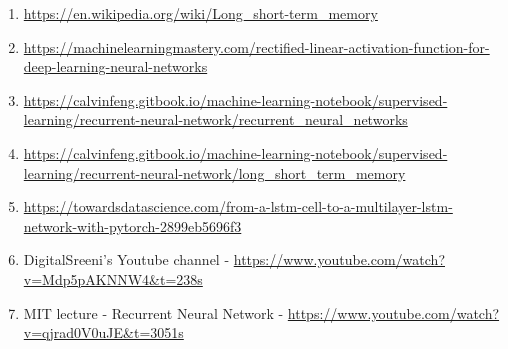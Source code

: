 \documentclass{article}
\begin{document}
\begin{enumerate}
	\item \url{https://en.wikipedia.org/wiki/Long_short-term_memory}
	\item \url{https://machinelearningmastery.com/rectified-linear-activation-function-for-deep-learning-neural-networks}
	\item \url{	https://calvinfeng.gitbook.io/machine-learning-notebook/supervised-learning/recurrent-neural-network/recurrent_neural_networks}
	\item \url{https://calvinfeng.gitbook.io/machine-learning-notebook/supervised-learning/recurrent-neural-network/long_short_term_memory}
	\item \url{https://towardsdatascience.com/from-a-lstm-cell-to-a-multilayer-lstm-network-with-pytorch-2899eb5696f3}
	\item DigitalSreeni's Youtube channel - \url{https://www.youtube.com/watch?v=Mdp5pAKNNW4&t=238s}
	\item MIT lecture - Recurrent Neural Network - \url{https://www.youtube.com/watch?v=qjrad0V0uJE&t=3051s}
\end{enumerate}



\newpage
\nocite{*}
\printbibliography
\end{document}
